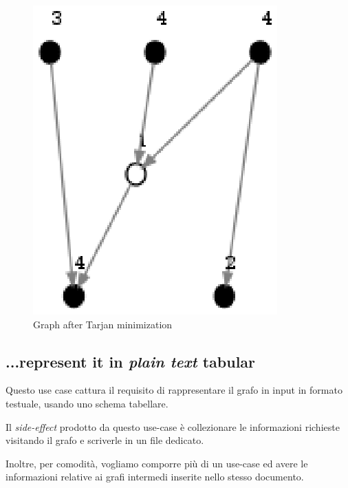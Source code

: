 \begin{figure}
  \centering
  \includegraphics{images/OnePipingLevelUnitTest_Printer_DFS_PrinterPipe_Crescenzi-phase-PrinterPipeFilter-level-2.eps}
  \caption{Graph after Tarjan minimization}
  \label{fig:tarjan-output}
\end{figure}

\subsection{...represent it in \emph{plain text} tabular}
Questo use case cattura il requisito di rappresentare il grafo in
input in formato testuale, usando uno schema tabellare.

Il \emph{side-effect} prodotto da questo use-case \`e collezionare le
informazioni richieste visitando il grafo e scriverle in un file
dedicato.

Inoltre, per comodit\`a, vogliamo comporre pi\`u di un use-case ed
avere le informazioni relative ai grafi intermedi inserite nello
stesso documento.

